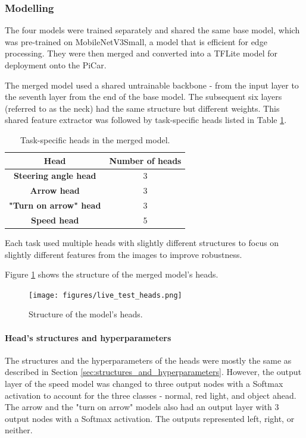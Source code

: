 \documentclass{article}
\begin{document}
\subsubsection{Modelling}
The four models were trained separately and shared the same base model, which was pre-trained on MobileNetV3Small, a model that is efficient for edge processing. They were then merged and converted into a TFLite model for deployment onto the PiCar.

The merged model used a shared untrainable backbone - from the input layer to the seventh layer from the end of the base model. The subsequent six layers (referred to as the neck) had the same structure but different weights. This shared feature extractor was followed by task-specific heads listed in Table \ref{tab:live_test_heads}.

\begin{table}[H]
  \centering
  \begin{tabular}{|c|c|}
    \hline
    \textbf{Head} & \textbf{Number of heads} \\ \hline
    \textbf{Steering angle head} & 3 \\ \hline
    \textbf{Arrow head} & 3 \\ \hline
    \textbf{"Turn on arrow" head} & 3 \\ \hline
    \textbf{Speed head} & 5 \\ \hline
  \end{tabular}
  \vspace{0.5em}
  \caption{Task-specific heads in the merged model.}
  \label{tab:live_test_heads}
\end{table}

Each task used multiple heads with slightly different structures to focus on slightly different features from the images to improve robustness.

Figure \ref{fig:live_test_heads} shows the structure of the merged model's heads.

\begin{figure}[h]
  \centering
  \texttt{[image: figures/live\_test\_heads.png]}
  \caption{Structure of the model's heads.}
  \label{fig:live_test_heads}
\end{figure}

\paragraph{Head's structures and hyperparameters}
The structures and the hyperparameters of the heads were mostly the same as described in Section \ref{sec:structures_and_hyperparameters}. However, the output layer of the speed model was changed to three output nodes with a Softmax activation to account for the three classes - normal, red light, and object ahead. The arrow and the "turn on arrow" models also had an output layer with 3 output nodes with a Softmax activation. The outputs represented left, right, or neither.
\end{document}
